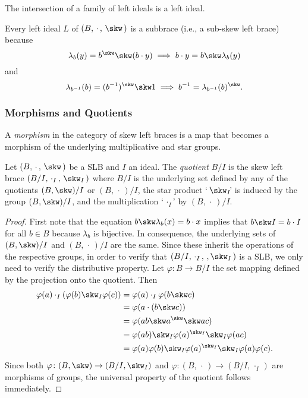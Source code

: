 \begin{rem}
    The intersection of a family of left ideals is a left ideal.
\end{rem}

\begin{rem}
    Every left ideal $L$ of $(B,\,\cdot\,,\,\skw\,)$ is a subbrace (i.e., a sub-skew left brace) because
    $$
        \lambda_b(y) = b^\skw\skw(b\cdot y)
            \implies b\cdot y = b\skw\lambda_b(y)
    $$
    and
    $$
        \lambda_{b^{-1}}(b) = (b^{-1})^\skw\skw1
            \implies b^{-1} = \lambda_{b^{-1}}(b)^\skw.
    $$
\end{rem}

\subsubsection*{Morphisms and Quotients}

\begin{defn}
    A \textsl{morphism} in the category of skew left braces is a map that becomes a morphism of the underlying multiplicative and star groups.
\end{defn}

\begin{prop}
    Let\/ $(B,\,\cdot\,,\,\skw\,)$ be a SLB and\/ $I$ an ideal. The \textsl{quotient\/}\/ $B/I$ is the skew left brace\/ $(B/I,\,\cdot_I\,,\,\skw_I\,)$ where\/ $B/I$ is the underlying set defined by any of the quotients\/ $(B,\skw)/I$ or\/ $(B,\,\cdot\,)/I$, the star product `$\,\skw_I\!$' is induced by the group\/ $(B,\skw)/I$, and the multiplication `${\,\cdot_I}\!$' by\/ $(B,\,\cdot\,)/I$.
\end{prop}

\begin{proof}
    First note that the equation $b\skw\lambda_b(x)=b\cdot x$ implies that $b\skw I=b\cdot I$ for all $b\in B$ because $\lambda_b$ is bijective. In consequence, the underlying sets of $(B,\skw)/I$ and $(B,\,\cdot\,)/I$ are the same. Since these inherit the operations of the respective groups, in order to verify that $(B/I,\,\cdot_I\,,\,,\skw_I\,)$ is a SLB, we only need to verify the distributive property. Let $\varphi\colon B\to B/I$ the set mapping defined by the projection onto the quotient. Then
    \begin{align*}
        \varphi(a)\cdot_I(\varphi(b)\skw_I\varphi(c))
            &= \varphi(a)\cdot_I\varphi(b\skw c)\\
            &= \varphi(a\cdot(b\skw c))\\
            &= \varphi(ab\skw a^\skw\skw ac)\\
            &= \varphi(ab)\skw_I\varphi(a)^{\skw_I}\skw_I\varphi(ac)\\
            &= \varphi(a)\varphi(b)\skw_I\varphi(a)^{\skw_I}
                \skw_I\varphi(a)\varphi(c).
    \end{align*}
    Since both $\varphi\colon(B,\skw)\to(B/I,\skw_I)$ and $\varphi\colon(B,\,\cdot\,)\to(B/I,\,\cdot_I\,)$ are morphisms of groups,
    the universal property of the quotient follows immediately.
\end{proof}

